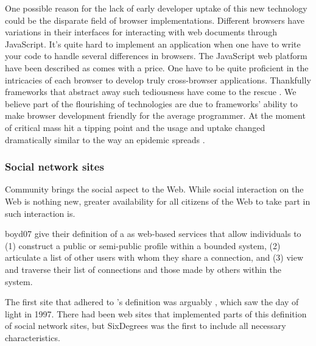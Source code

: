 One possible reason for the lack of early developer uptake of this new
technology could be the disparate field of browser implementations.
Different browsers have variations in their interfaces for interacting with
web documents through JavaScript.%
It's quite hard to implement an application
when one have to write your code to handle several differences in browsers.
The JavaScript web platform have been described as
 comes with a price. One have to be quite proficient in the
intricacies of each browser to develop truly cross-browser applications.
Thankfully frameworks that abstract away such tediousness have come to
the rescue \citep[]{mesbah07}. We believe part of the flourishing of
 technologies are due to frameworks' ability to make browser
development friendly for the average programmer. At the moment of critical
mass  hit a tipping point and the usage and uptake changed
dramatically similar to the way an epidemic spreads
\citep[]{gladwell02}.

\subsubsection{Social network sites}
\label{section:social.navigation.sociality.the.social.web.social.network.sites}
Community brings the social aspect to the Web. While social
interaction on the Web is nothing new, greater availability for all
citizens of the Web to take part in such interaction is.

\begin{fullquote}{boyd07}{%
  give their definition of a  as}
    web-based services that allow individuals to (1) construct a public
    or semi-public profile within a bounded system, (2) articulate a list of
    other users with whom they share a connection, and (3) view and traverse
    their list of connections and those made by others within the system.
\end{fullquote}

The first site that adhered to \citeauthor{boyd07}'s definition was arguably
, which saw the day of light in 1997.%
There had been web sites that implemented
parts of this definition of social network sites, but SixDegrees was the
first to include all necessary characteristics.

